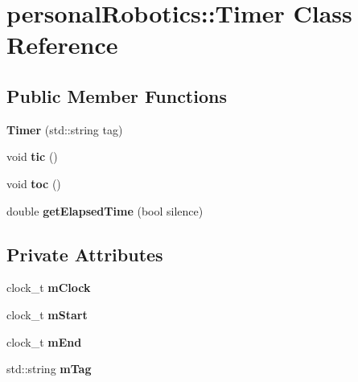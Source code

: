 \hypertarget{classpersonal_robotics_1_1_timer}{}\section{personal\+Robotics\+:\+:Timer Class Reference}
\label{classpersonal_robotics_1_1_timer}
\subsection*{Public Member Functions}
\begin{DoxyCompactItemize}
\item 
\hypertarget{classpersonal_robotics_1_1_timer_ad1bac9f68d62abd7cdc8c8f2437fc023}{}{\bfseries Timer} (std\+::string tag)\label{classpersonal_robotics_1_1_timer_ad1bac9f68d62abd7cdc8c8f2437fc023}

\item 
\hypertarget{classpersonal_robotics_1_1_timer_a2ac3afcf55bb445e7c9bbec7295cfe0f}{}void {\bfseries tic} ()\label{classpersonal_robotics_1_1_timer_a2ac3afcf55bb445e7c9bbec7295cfe0f}

\item 
\hypertarget{classpersonal_robotics_1_1_timer_a6b86ba949e6f58daba4045390af4e8e7}{}void {\bfseries toc} ()\label{classpersonal_robotics_1_1_timer_a6b86ba949e6f58daba4045390af4e8e7}

\item 
\hypertarget{classpersonal_robotics_1_1_timer_ab3829c97476e592d6a006e671557de4d}{}double {\bfseries get\+Elapsed\+Time} (bool silence)\label{classpersonal_robotics_1_1_timer_ab3829c97476e592d6a006e671557de4d}

\end{DoxyCompactItemize}
\subsection*{Private Attributes}
\begin{DoxyCompactItemize}
\item 
\hypertarget{classpersonal_robotics_1_1_timer_a5329fe5efbe488c87561e207140c51dd}{}clock\+\_\+t {\bfseries m\+Clock}\label{classpersonal_robotics_1_1_timer_a5329fe5efbe488c87561e207140c51dd}

\item 
\hypertarget{classpersonal_robotics_1_1_timer_a43dc8d300ba5e5193f7a5c8babc0f944}{}clock\+\_\+t {\bfseries m\+Start}\label{classpersonal_robotics_1_1_timer_a43dc8d300ba5e5193f7a5c8babc0f944}

\item 
\hypertarget{classpersonal_robotics_1_1_timer_af61b6d78dba3462912218f0a26aef2ab}{}clock\+\_\+t {\bfseries m\+End}\label{classpersonal_robotics_1_1_timer_af61b6d78dba3462912218f0a26aef2ab}

\item 
\hypertarget{classpersonal_robotics_1_1_timer_a25b18e8f5cec8ed7a91038e3d629a805}{}std\+::string {\bfseries m\+Tag}\label{classpersonal_robotics_1_1_timer_a25b18e8f5cec8ed7a91038e3d629a805}

\end{DoxyCompactItemize}


